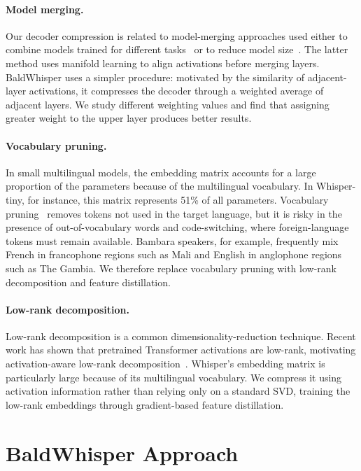 \paragraph{Model merging.}
Our decoder compression is related to model-merging approaches used either to combine models trained for different tasks~\citep{wortsman2022modelsoupsaveragingweights,yadav2023tiesmergingresolvinginterferencemerging} or to reduce model size~\citep{liu2024pruningmergingcompressingllms}. The latter method uses manifold learning to align activations before merging layers. BaldWhisper uses a simpler procedure: motivated by the similarity of adjacent-layer activations, it compresses the decoder through a weighted average of adjacent layers. We study different weighting values and find that assigning greater weight to the upper layer produces better results.

\paragraph{Vocabulary pruning.}
In small multilingual models, the embedding matrix accounts for a large proportion of the parameters because of the multilingual vocabulary. In Whisper-tiny, for instance, this matrix represents 51\% of all parameters. Vocabulary pruning~\citep{abdaoui-etal-2020-load,vocabprune} removes tokens not used in the target language, but it is risky in the presence of out-of-vocabulary words and code-switching, where foreign-language tokens must remain available. Bambara speakers, for example, frequently mix French in francophone regions such as Mali and English in anglophone regions such as The Gambia. We therefore replace vocabulary pruning with low-rank decomposition and feature distillation.

\paragraph{Low-rank decomposition.}
Low-rank decomposition is a common dimensionality-reduction technique. Recent work has shown that pretrained Transformer activations are low-rank, motivating activation-aware low-rank decomposition~\citep{yu_compressing_2023,chen_drone}. Whisper's embedding matrix is particularly large because of its multilingual vocabulary. We compress it using activation information rather than relying only on a standard SVD, training the low-rank embeddings through gradient-based feature distillation.

\section{BaldWhisper Approach}
\label{sec:method-bw}

